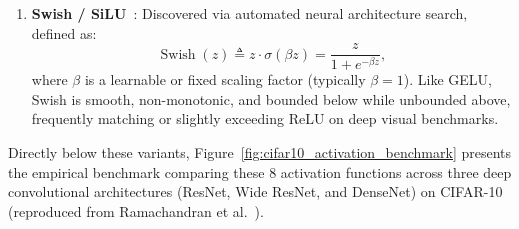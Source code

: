 \begin{enumerate}[leftmargin=*]
    \begin{equation}
    \operatorname{GELU}(z) \triangleq z \Phi(z) = z \int_{-\infty}^z \frac{1}{\sqrt{2\pi}} e^{-\frac{t^2}{2}} \, dt \approx 0.5 z \left( 1 + \tanh\left( \sqrt{\frac{2}{\pi}} (z + 0.044715 z^3) \right) \right).
    \label{eq:gelu_definition}
    \end{equation}
    GELU is smooth, differentiable everywhere, and \textbf{non-monotonic}: it dips to a minimum of $\approx -0.17$ at $z \approx -0.75$ before approaching zero. GELU has become the universal standard activation in modern Transformer foundation models (BERT, GPT-2/3/4, LLaMA, Vision Transformers).
  \item \textbf{Swish / SiLU}~\cite{ramachandran2017searching}: Discovered via automated neural architecture search, defined as:
    \begin{equation}
    \operatorname{Swish}(z) \triangleq z \cdot \sigma(\beta z) = \frac{z}{1 + e^{-\beta z}},
    \label{eq:swish_definition}
    \end{equation}
    where $\beta$ is a learnable or fixed scaling factor (typically $\beta = 1$). Like GELU, Swish is smooth, non-monotonic, and bounded below while unbounded above, frequently matching or slightly exceeding ReLU on deep visual benchmarks.
\end{enumerate}

Directly below these variants, Figure~\ref{fig:cifar10_activation_benchmark} presents the empirical benchmark comparing these 8 activation functions across three deep convolutional architectures (ResNet, Wide ResNet, and DenseNet) on CIFAR-10 (reproduced from Ramachandran et al.~\cite{ramachandran2017searching}).

